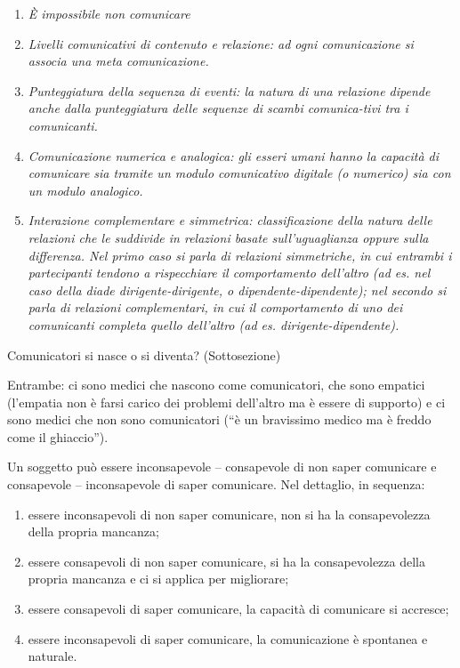 \documentclass[]{article}
\begin{document}
\begin{enumerate}
\def\labelenumi{\arabic{enumi}.}
\item
  \emph{È impossibile non comunicare}
\item
  \emph{Livelli comunicativi di contenuto e relazione: ad ogni
  comunicazione si associa una meta comunicazione.}
\item
  \emph{Punteggiatura della sequenza di eventi: la natura di una
  relazione dipende anche dalla punteggiatura delle sequenze di scambi
  comunica-tivi tra i comunicanti.}
\item
  \emph{Comunicazione numerica e analogica: gli esseri umani hanno la
  capacità di comunicare sia tramite un modulo comunicativo digitale (o
  numerico) sia con un modulo analogico.}
\item
  \emph{Interazione complementare e simmetrica: classificazione della
  natura delle relazioni che le suddivide in relazioni basate
  sull'uguaglianza oppure sulla differenza. Nel primo caso si parla di
  relazioni simmetriche, in cui entrambi i partecipanti tendono a
  rispecchiare il comportamento dell'altro (ad es. nel caso della diade
  dirigente-dirigente, o dipendente-dipendente); nel secondo si parla di
  relazioni complementari, in cui il comportamento di uno dei
  comunicanti completa quello dell'altro (ad es. dirigente-dipendente).}
\end{enumerate}

Comunicatori si nasce o si diventa? (Sottosezione)

Entrambe: ci sono medici che nascono come comunicatori, che sono
empatici (l'empatia non è farsi carico dei problemi dell'altro ma è
essere di supporto) e ci sono medici che non sono comunicatori (``è un
bravissimo medico ma è freddo come il ghiaccio'').

Un soggetto può essere inconsapevole -- consapevole di non saper
comunicare e consapevole -- inconsapevole di saper comunicare. Nel
dettaglio, in sequenza:

\begin{enumerate}
\def\labelenumi{\arabic{enumi}.}
\item
  essere inconsapevoli di non saper comunicare, non si ha la
  consapevolezza della propria mancanza;
\item
  essere consapevoli di non saper comunicare, si ha la consapevolezza
  della propria mancanza e ci si applica per migliorare;
\item
  essere consapevoli di saper comunicare, la capacità di comunicare si
  accresce;
\item
  essere inconsapevoli di saper comunicare, la comunicazione è spontanea
  e naturale.
\end{enumerate}
\end{document}
